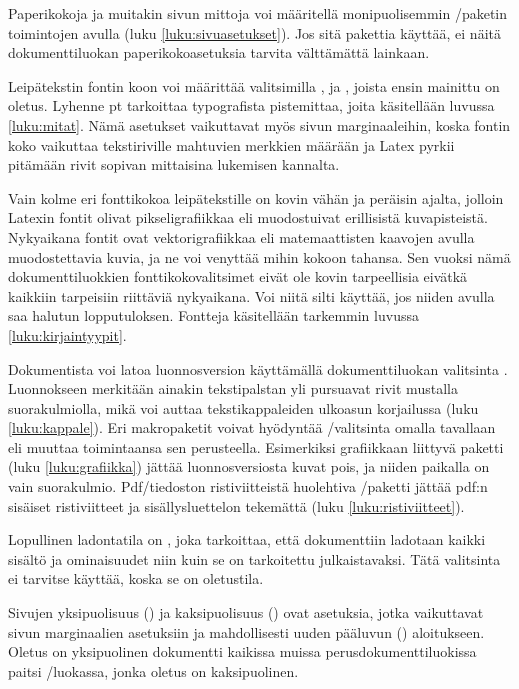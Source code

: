 Paperikokoja ja muitakin sivun mittoja voi määritellä monipuolisemmin
\-/paketin toimintojen avulla (luku
\ref{luku:sivuasetukset}). Jos sitä pakettia käyttää, ei näitä
dokumenttiluokan paperi\-koko\-ase\-tuk\-sia tarvita välttämättä
lainkaan.

Leipätekstin%
\koodimargin{10pt \\ 11pt \\ 12pt} fontin koon voi määrittää
valitsimilla \koodi{10pt}, \koodi{11pt} ja \koodi{12pt}, joista ensin
mainittu on oletus. Lyhenne pt tarkoittaa typografista pistemittaa,
joita käsitellään luvussa \ref{luku:mitat}. Nämä asetukset vaikuttavat
myös sivun marginaaleihin, koska fontin koko vaikuttaa tekstiriville
mahtuvien merkkien määrään ja Latex pyrkii pitämään rivit sopivan
mittaisina lukemisen kannalta.

Vain kolme eri fonttikokoa leipätekstille on kovin vähän ja peräisin
ajalta, jolloin Latexin fontit olivat pik\-seli\-gra\-fiik\-kaa eli
muodostuivat erillisistä kuvapisteistä. Nyky\-aika\-na fontit ovat
vek\-tori\-gra\-fiik\-kaa eli matemaattisten kaavojen avulla
muodostettavia kuvia, ja ne voi venyttää mihin kokoon tahansa. Sen
vuoksi nämä dokumenttiluokkien fonttikokovalitsimet eivät ole kovin
tarpeellisia eivätkä kaikkiin tarpeisiin riittäviä nykyaikana. Voi niitä
silti käyttää, jos niiden avulla saa halutun lopputuloksen. Fontteja
käsitellään tarkemmin luvussa \ref{luku:kirjaintyypit}.

Dokumentista%
 voi latoa luonnosversion käyttämällä
dokumenttiluokan valitsinta . Luonnokseen merkitään ainakin
tekstipalstan yli pursuavat rivit mustalla suorakulmiolla, mikä voi
auttaa tekstikappaleiden ulkoasun korjailussa (luku \ref{luku:kappale}).
Eri makropaketit voivat hyödyntää \-/valitsinta omalla
tavallaan eli muuttaa toimintaansa sen perusteella. Esimerkiksi
grafiikkaan liittyvä paketti  (luku
\ref{luku:grafiikka}) jättää luonnosversiosta kuvat pois, ja niiden
paikalla on vain suorakulmio. Pdf\-/tiedoston ristiviitteistä huolehtiva
\-/paketti jättää pdf:n sisäiset ristiviitteet ja
sisällysluettelon tekemättä (luku \ref{luku:ristiviitteet}).

Lopullinen%
 ladontatila on , joka tarkoittaa, että
dokumenttiin ladotaan kaikki sisältö ja ominaisuudet niin kuin se on
tarkoitettu julkaistavaksi. Tätä valitsinta ei tarvitse käyttää, koska
se on oletustila.

Sivujen%
 yksipuolisuus () ja
kaksipuolisuus () ovat asetuksia, jotka vaikuttavat
sivun marginaalien asetuksiin ja mahdollisesti uuden pääluvun
() aloitukseen. Oletus on yksipuolinen dokumentti
kaikissa muissa perusdokumenttiluokissa paitsi \-/luokassa,
jonka oletus on kaksipuolinen.

